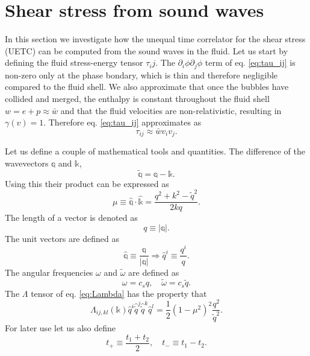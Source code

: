 \section{Shear stress from sound waves}
\label{shear_stress}
In this section we investigate how the unequal time correlator for the shear stress (UETC) can be computed from the sound waves in the fluid.
Let us start by defining the fluid stress-energy tensor $\tau_ij$.
The $\partial_i \phi \partial_j \phi$ term of eq. \eqref{eq:tau_ij} is non-zero only at the phase bondary,
which is thin and therefore negligible compared to the fluid shell.
We also approximate that once the bubbles have collided and merged,
the enthalpy is constant throughout the fluid shell $w = e + p \approx \bar{w}$
and that the fluid velocities are non-relativistic, resulting in $\gamma(v) = 1$.
Therefore eq. \eqref{eq:tau_ij} approximates as
\cite[eq. 3.12]{hindmarsh_gw_pt_2019}
\begin{equation}
\tau_{ij} \approx \bar{w} v_i v_j.
\label{eq:tau_ij_approx}
\end{equation}

Let us define a couple of mathematical tools and quantities.
The difference of the wavevectors $\mathbb{q}$ and $\mathbb{k}$,
\begin{equation}
\tilde{\mathbb{q}} = \mathbb{q} - \mathbb{k}.
\label{eq:tilde_q}
\end{equation}
Using this their product can be expressed as
\begin{equation}
\mu \equiv \hat{\mathbb{q}} \cdot \hat{\mathbb{k}} = \frac{q^2 + k^2 - \tilde{q}^2}{2kq}.
\label{eq:mu}
\end{equation}
The length of a vector is denoted as
\begin{equation}
q \equiv |\mathbb{q}|.
\end{equation}
The unit vectors are defined as
\begin{equation}
\hat{\mathbb{q}} \equiv \frac{\mathbb{q}}{|\mathbb{q}|} \Rightarrow
\hat{q}^i \equiv \frac{q^i}{q}.
\end{equation}
The angular frequencies $\omega$ and $\tilde{\omega}$ are defined as
\cite[p. 10]{hindmarsh_gw_pt_2019}
\begin{equation}
\omega = c_s q, \quad \tilde{\omega} = c_s \tilde{q}.
\end{equation}
The $\Lambda$ tensor of eq. \eqref{eq:Lambda} has the property that
\cite[eq. 3.17]{hindmarsh_gw_pt_2019}
\begin{equation}
\Lambda_{ij,kl}(\mathbb{k}) \hat{q}^i \hat{\tilde{q}}^j \hat{\tilde{q}}^k \hat{q}^l = \frac{1}{2}(1 - \mu^2)^2 \frac{q^2}{\tilde{q}^2}.
\end{equation}
For later use let us also define
\cite[p. 11]{hindmarsh_gw_pt_2019}
\begin{equation}
t_+ \equiv \frac{t_1 + t_2}{2}, \quad t_- \equiv t_1 - t_2.
\label{eq:t_plus_minus}
\end{equation}


